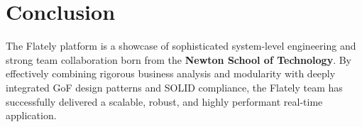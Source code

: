 \documentclass[12pt,a4paper]{article}
\begin{document}
\section{Conclusion}
The Flately platform is a showcase of sophisticated system-level engineering and strong team collaboration born from the \textbf{Newton School of Technology}. By effectively combining rigorous business analysis and modularity with deeply integrated GoF design patterns and SOLID compliance, the Flately team has successfully delivered a scalable, robust, and highly performant real-time application.
\end{document}
